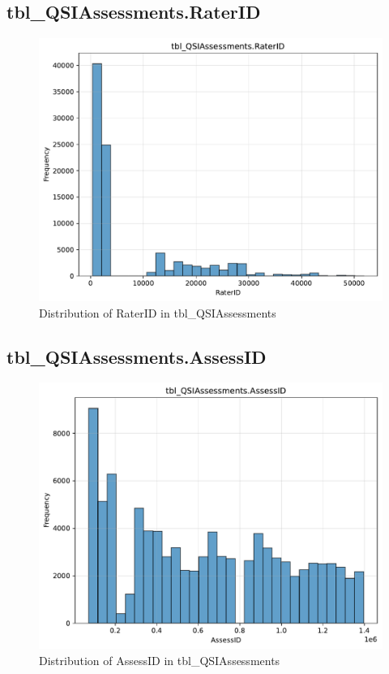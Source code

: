 \subsection{tbl\_QSIAssessments.RaterID}

\begin{figure}[htbp]
\centering
\includegraphics[width=\textwidth]{figures/dbo_tbl_QSIAssessments_RaterID.pdf}
\caption{Distribution of RaterID in tbl\_QSIAssessments}
\end{figure}\newpage

\subsection{tbl\_QSIAssessments.AssessID}

\begin{figure}[htbp]
\centering
\includegraphics[width=\textwidth]{figures/dbo_tbl_QSIAssessments_AssessID.pdf}
\caption{Distribution of AssessID in tbl\_QSIAssessments}
\end{figure}\newpage

